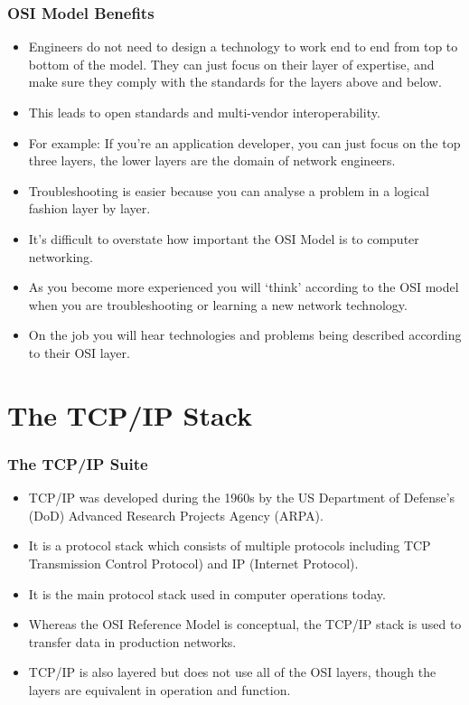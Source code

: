 \documentclass[pdflatex,compress]{beamer}
\begin{document}
\begin{frame}
	\frametitle{OSI Model Benefits}
	\begin{itemize}
		\item Engineers do not need to design a technology to work end to end from top to bottom of the model. They can just focus on their layer of expertise, and make sure they comply with the standards for the layers above and below.
		\item This leads to open standards and multi-vendor interoperability.
		\item For example: If you’re an application developer, you can just focus on the top three layers, the lower layers are the domain of network engineers.
		\item Troubleshooting is easier because you can analyse a problem in a logical fashion layer by layer.
	\end{itemize}
\end{frame}

\begin{frame}
	\begin{itemize}
		\item It’s difficult to overstate how important the OSI Model is to computer networking.
		\item As you become more experienced you will ‘think’ according to the OSI model when you are troubleshooting or learning a new network technology.
		\item On the job you will hear technologies and problems being described according to their OSI layer.
	\end{itemize}
\end{frame}

\section{The TCP/IP Stack}

\begin{frame}
	\frametitle{The TCP/IP Suite}
	\begin{itemize}
		\item TCP/IP was developed during the 1960s by the US Department of Defense’s (DoD) Advanced Research Projects Agency (ARPA).
		\item It is a protocol stack which consists of multiple protocols including TCP Transmission Control Protocol) and IP (Internet Protocol).
		\item It is the main protocol stack used in computer operations today.
		\item Whereas the OSI Reference Model is conceptual, the TCP/IP stack is used to transfer data in production networks.
		\item TCP/IP is also layered but does not use all of the OSI layers, though the layers are equivalent in operation and function.
	\end{itemize}
\end{frame}
\end{document}
